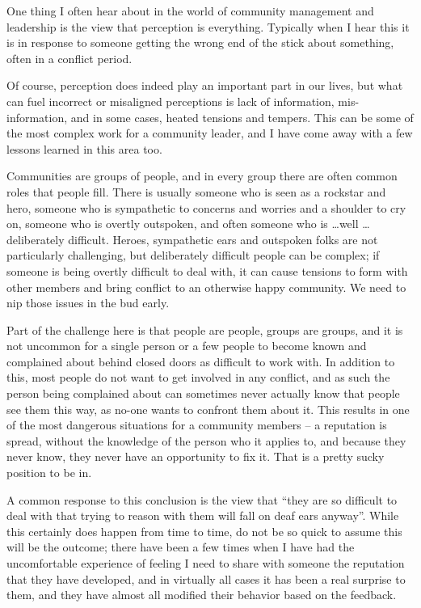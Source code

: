 One thing I often hear about in the world of community management and leadership is the view that perception is everything. Typically when I hear this it is in response to someone getting the wrong end of the stick about something, often in a conflict period.

Of course, perception does indeed play an important part in our lives, but what can fuel incorrect or misaligned perceptions is lack of information, mis-information, and in some cases, heated tensions and tempers. This can be some of the most complex work for a community leader, and I have come away with a few lessons learned in this area too.

Communities are groups of people, and in every group there are often common roles that people fill. There is usually someone who is seen as a rockstar and hero, someone who is sympathetic to concerns and worries and a shoulder to cry on, someone who is overtly outspoken, and often someone who is \dots well \dots deliberately difficult. Heroes, sympathetic ears and outspoken folks are not particularly challenging, but deliberately difficult people can be complex; if someone is being overtly difficult to deal with, it can cause tensions to form with other members and bring conflict to an otherwise happy community. We need to nip those issues in the bud early.

Part of the challenge here is that people are people, groups are groups, and it is not uncommon for a single person or a few people to become known and complained about behind closed doors as difficult to work with. In addition to this, most people do not want to get involved in any conflict, and as such the person being complained about can sometimes never actually know that people see them this way, as no-one wants to confront them about it. This results in one of the most dangerous situations for a community members -- a reputation is spread, without the knowledge of the person who it applies to, and because they never know, they never have an opportunity to fix it. That is a pretty sucky position to be in.

A common response to this conclusion is the view that ``they are so difficult to deal with that trying to reason with them will fall on deaf ears anyway''. While this certainly does happen from time to time, do not be so quick to assume this will be the outcome; there have been a few times when I have had the uncomfortable experience of feeling I need to share with someone the reputation that they have developed, and in virtually all cases it has been a real surprise to them, and they have almost all modified their behavior based on the feedback.

